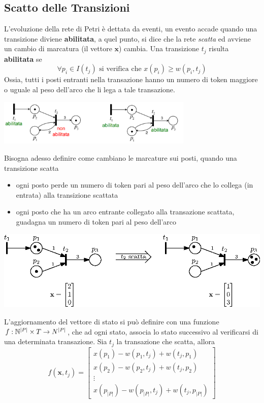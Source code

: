 \documentclass[10pt, letterpaper]{report}
\begin{document}
\subsection{Scatto delle Transizioni}
L'evoluzione della rete di Petri è dettata da eventi, un evento accade quando una transizione diviene \textbf{abilitata}, a quel punto, si dice che la rete \textit{scatta} ed avviene un cambio di marcatura (il vettore $\mathbf x$) cambia.\acc 
Una transizione $t_j$ risulta \textbf{abilitata} se 
$$ \forall p_i\in I(t_j) \text{ si verifica che }x(p_i)\ge w(p_i,t_j)$$
Ossia, tutti i posti entranti nella transazione hanno un numero di token maggiore o uguale al peso dell'arco che li lega a tale transazione.
\begin{center}
    \includegraphics[width=0.7\textwidth]{images/petriAbilitata.png}
\end{center}
Bisogna adesso definire come cambiano le marcature sui posti, quando una transizione scatta\begin{itemize}
    \item ogni posto perde un numero di token pari al peso dell'arco che lo collega (in entrata) alla transizione scattata
    \item ogni posto che ha un arco entrante collegato alla transazione scattata, guadagna un numero di token pari al peso dell'arco
\end{itemize}
\begin{center}
    \includegraphics[width=\textwidth]{images/scattoPetri.eps}
\end{center}
L'aggiornamento del vettore di stato si può definire con una funzione $f:{\mathbb N}^{|P|}\times T \rightarrow N^{|P|}$, che ad ogni stato, associa lo stato successivo al verificarsi di una determinata transazione. Sia $t_j$ la transazione che scatta, allora 
$$ f(\mathbf x,t_j) = \begin{bmatrix}
    x(p_1) - w(p_1,t_j)+w(t_j,p_1)\\ 
    x(p_2) - w(p_2,t_j)+w(t_j,p_2)\\ 
    \vdots \\ 
    x(p_{|P|}) - w(p_{|P|},t_j)+w(t_j,p_{|P|})
\end{bmatrix}$$
\end{document}
